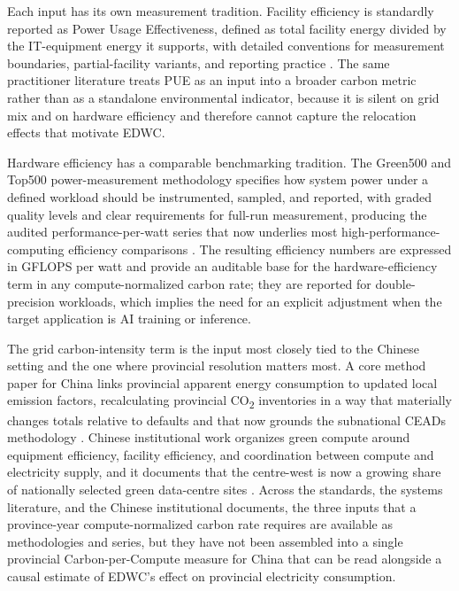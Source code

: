 \documentclass[12pt,a4paper]{article}
\begin{document}
Each input has its own measurement tradition. Facility efficiency is
standardly reported as Power Usage Effectiveness, defined as total
facility energy divided by the IT-equipment energy it supports, with
detailed conventions for measurement boundaries, partial-facility
variants, and reporting practice
\citep{thegreengrid-2012-puecomprehensiveexamination}. The same
practitioner literature treats PUE as an input into a broader
carbon metric rather than as a standalone environmental indicator,
because it is silent on grid mix and on hardware efficiency and
therefore cannot capture the relocation effects that motivate EDWC.

Hardware efficiency has a comparable benchmarking tradition. The
Green500 and Top500 power-measurement methodology specifies how
system power under a defined workload should be instrumented,
sampled, and reported, with graded quality levels and clear
requirements for full-run measurement, producing the audited
performance-per-watt series that now underlies most high-performance-computing
efficiency comparisons
\citep{energyefficienthighperformancecomputingworkinggroup-2015-energyefficienthigh}.
The resulting efficiency numbers are expressed in GFLOPS per watt and
provide an auditable base for the hardware-efficiency term in any
compute-normalized carbon rate; they are reported for
double-precision workloads, which implies the need for an explicit
adjustment when the target application is AI training or inference.

The grid carbon-intensity term is the input most closely tied to the
Chinese setting and the one where provincial resolution matters
most. A core method paper for China links provincial apparent energy
consumption to updated local emission factors, recalculating
provincial CO\textsubscript{2} inventories in a way that materially
changes totals relative to defaults and that now grounds the
subnational CEADs methodology
\citep{shanetal-2016-newprovincialco2}. Chinese institutional work
organizes green compute around equipment efficiency, facility
efficiency, and coordination between compute and electricity
supply, and it documents that the centre-west is now a growing share
of nationally selected green data-centre sites
\citep{chinaacademyofinformationandcommunicationstechnologyhoringernewarea-2024-zhongguolusesuanlifazhanyanjiubaogao2024nian}.
Across the standards, the systems literature, and the Chinese
institutional documents, the three inputs that a province-year
compute-normalized carbon rate requires are available as
methodologies and series, but they have not been assembled into a
single provincial Carbon-per-Compute measure for China that can be
read alongside a causal estimate of EDWC's effect on provincial
electricity consumption.
\end{document}

